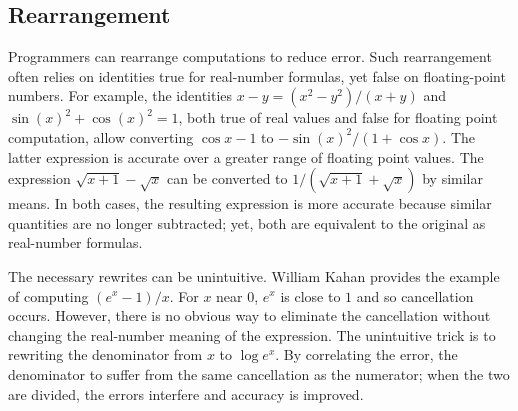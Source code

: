 \documentclass[paper.tex]{subfiles}
\begin{document}
\subsection{Rearrangement}

Programmers can rearrange computations to reduce error.  Such
rearrangement often relies on identities true for real-number
formulas, yet false on floating-point numbers.  For example, the
identities $x - y = (x^2 - y^2) / (x + y)$ and $\sin(x)^2 + \cos(x)^2
= 1$, both true of real values and false for floating point
computation, allow converting $\cos x - 1$ to $- \sin(x)^2 / (1 + \cos
x)$.  The latter expression is accurate over a greater range of
floating point values.  The expression $\sqrt{x+1} - \sqrt{x}$ can be
converted to $1 / (\sqrt{x+1} + \sqrt{x})$ by similar means.  In both
cases, the resulting expression is more accurate because similar
quantities are no longer subtracted; yet, both are equivalent to the
original as real-number formulas.

The necessary rewrites can be unintuitive.  William Kahan provides the
example~\cite{} of computing $(e^x - 1) / x$.  For $x$ near $0$, $e^x$
is close to $1$ and so cancellation occurs.  However, there is no
obvious way to eliminate the cancellation without changing the
real-number meaning of the expression.  The unintuitive trick is to
rewriting the denominator from $x$ to $\log e^x$.  By correlating the
error, the denominator to suffer from the same cancellation as the
numerator; when the two are divided, the errors interfere and accuracy
is improved.
\end{document}
